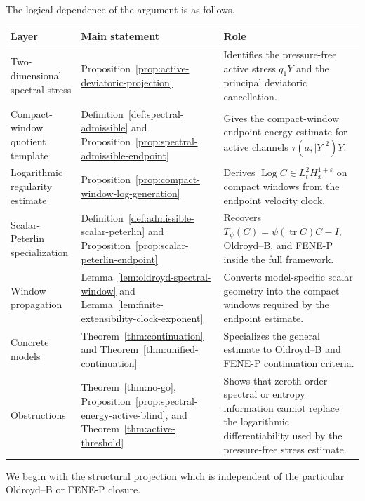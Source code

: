 \documentclass[11pt]{article}
\newcommand{\tr}{\operatorname{tr}}
\newcommand{\Log}{\operatorname{Log}}
\newcommand{\eps}{\varepsilon}
\begin{document}
The logical dependence of the argument is as follows.
\begin{center}
\small
\begin{tabular}{>{\raggedright\arraybackslash}p{}
                >{\raggedright\arraybackslash}p{}
                >{\raggedright\arraybackslash}p{}}
\hline
Layer & Main statement & Role \\
\hline
Two-dimensional spectral stress &
Proposition~\ref{prop:active-deviatoric-projection} &
Identifies the pressure-free active stress \(q_1Y\) and the principal
deviatoric cancellation. \\
Compact-window quotient template &
Definition~\ref{def:spectral-admissible} and
Proposition~\ref{prop:spectral-admissible-endpoint} &
Gives the compact-window endpoint energy estimate for active channels
\(\tau(a,|Y|^2)Y\). \\
Logarithmic regularity estimate &
Proposition~\ref{prop:compact-window-log-generation} &
Derives \(\Log C\in L^2_tH^{1+\eps}_x\) on compact windows from the endpoint
velocity clock. \\
Scalar-Peterlin specialization &
Definition~\ref{def:admissible-scalar-peterlin} and
Proposition~\ref{prop:scalar-peterlin-endpoint} &
Recovers \(T_\psi(C)=\psi(\tr C)C-I\), Oldroyd--B, and FENE-P inside the full
framework. \\
Window propagation &
Lemma~\ref{lem:oldroyd-spectral-window} and
Lemma~\ref{lem:finite-extensibility-clock-exponent} &
Converts model-specific scalar geometry into the compact windows required by
the endpoint estimate. \\
Concrete models &
Theorem~\ref{thm:continuation} and
Theorem~\ref{thm:unified-continuation} &
Specializes the general estimate to Oldroyd--B and FENE-P continuation
criteria. \\
Obstructions &
Theorem~\ref{thm:no-go}, Proposition~\ref{prop:spectral-energy-active-blind},
and Theorem~\ref{thm:active-threshold} &
Shows that zeroth-order spectral or entropy information cannot replace the
logarithmic differentiability used by the pressure-free stress estimate. \\
\hline
\end{tabular}
\end{center}

We begin with the structural projection which is independent of the particular
Oldroyd--B or FENE-P closure.
\end{document}
